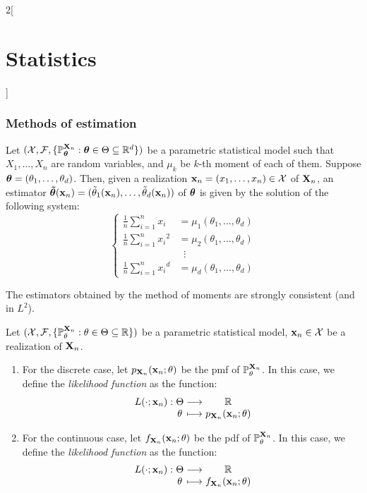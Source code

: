 \documentclass[../../../main.tex]{subfiles}
\begin{document}
\begin{multicols}{2}[\section{Statistics}]
  \subsubsection{Methods of estimation}
  \begin{definition}
    Let $(\mathcal{X},\mathcal{F},\{\mathbb{P}_{\boldsymbol{\mathrm{\theta}}}^{\boldsymbol{\mathrm{X}}_n}:\boldsymbol{\mathrm{\theta}}\in\Theta\subseteq \mathbb{R}^d\})$ be a parametric statistical model such that $X_1,\ldots,X_n$ are \iid random variables, and $\mu_k$ be $k$-th moment of each of them. Suppose $\boldsymbol{\mathrm{\theta}}=(\theta_1,\ldots,\theta_d)$. Then, given a realization $\boldsymbol{\mathrm{x}}_n=(x_1,\ldots,x_n)\in\mathcal{X}$ of $\boldsymbol{\mathrm{X}}_n$, an estimator $\boldsymbol{\mathrm{\tilde{\theta}}}(\boldsymbol{\mathrm{x}}_n)=(\tilde{\theta}_1(\boldsymbol{\mathrm{x}}_n),\ldots,\tilde{\theta}_d(\boldsymbol{\mathrm{x}}_n))$ of $\boldsymbol{\mathrm{\theta}}$ is given by the solution of the following system:
    $$
      \left\{
      \begin{aligned}
        \frac{1}{n}\sum_{i=1}^nx_i     & =\mu_1(\theta_1,\ldots,\theta_d) \\
        \frac{1}{n}\sum_{i=1}^n{x_i}^2 & =\mu_2(\theta_1,\ldots,\theta_d) \\
                                       & \;\;\vdots                       \\
        \frac{1}{n}\sum_{i=1}^n{x_i}^d & =\mu_d(\theta_1,\ldots,\theta_d)
      \end{aligned}
      \right.
    $$
  \end{definition}
  \begin{proposition}
    The estimators obtained by the method of moments are strongly consistent (and in $L^2$).
  \end{proposition}
  \begin{definition}[Likelihood]
    Let $(\mathcal{X},\mathcal{F},\{\mathbb{P}_{\theta}^{\boldsymbol{\mathrm{X}}_n}:{\theta}\in\Theta\subseteq \mathbb{R}\})$ be a parametric statistical model, $\boldsymbol{\mathrm{x}}_n\in\mathcal{X}$ be a realization of $\boldsymbol{\mathrm{X}}_n$.
    \begin{enumerate}
      \item For the discrete case, let $p_{\boldsymbol{\mathrm{X}}_n}(\boldsymbol{\mathrm{x}}_n;\theta)$ be the pmf of $\mathbb{P}_{\theta}^{\boldsymbol{\mathrm{X}}_n}$. In this case, we define the \emph{likelihood function} as the function:
            $$\function{L(\cdot;\vf{x}_n)}{\Theta}{\RR}{\theta}{p_{\vf{X}_n}(\vf{x}_n;\theta)}$$
      \item For the continuous case, let $f_{\boldsymbol{\mathrm{X}}_n}(\boldsymbol{\mathrm{x}}_n;\theta)$ be the pdf of $\mathbb{P}_{\theta}^{\boldsymbol{\mathrm{X}}_n}$. In this case, we define the \emph{likelihood function} as the function:
            $$\function{L(\cdot;\vf{x}_n)}{\Theta}{\RR}{\theta}{f_{\vf{X}_n}(\vf{x}_n;\theta)}$$

\end{enumerate}
\end{definition}
\end{multicols}
\end{document}
